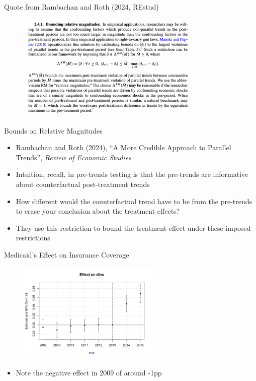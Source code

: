 \documentclass{beamer}
\begin{document}
\begin{frame}{Quote from Rambachan and Roth (2024, REstud)}
    \begin{figure}
        \centering
        \includegraphics[width=0.8\textwidth, height=0.8\textheight, keepaspectratio]{./lecture_includes/rr_quote}
    \end{figure}
\end{frame}


\begin{frame}{Bounds on Relative Magnitudes}

\begin{itemize}

\item Rambachan and Roth (2024), ``A More Credible Approach to Parallel Trends'', \emph{Review of Economic Studies}
\item Intuition, recall, in pre-trends testing is that the pre-trends are informative about counterfactual post-treatment trends
\item How different would the counterfactual trend have to be from the pre-trends to erase your conclusion about the treatment effects?
\item They use this restriction to bound the treatment effect under these imposed restrictions

\end{itemize}

\end{frame}

\begin{frame}{Medicaid's Effect on Insurance Coverage}
    \begin{figure}
        \centering
        \includegraphics[width=0.6\textwidth, height=0.6\textheight, keepaspectratio]{./lecture_includes/original_miller.png}
    \end{figure}
    \begin{itemize}
        \item Note the negative effect in 2009 of around -1pp
    \end{itemize}
\end{frame}
\end{document}
